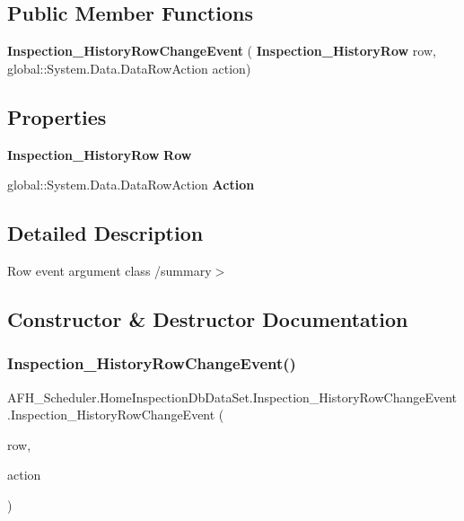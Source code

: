 \subsection*{Public Member Functions}
\begin{DoxyCompactItemize}
\item 
\textbf{ Inspection\+\_\+\+History\+Row\+Change\+Event} (\textbf{ Inspection\+\_\+\+History\+Row} row, global\+::\+System.\+Data.\+Data\+Row\+Action action)
\end{DoxyCompactItemize}
\subsection*{Properties}
\begin{DoxyCompactItemize}
\item 
\textbf{ Inspection\+\_\+\+History\+Row} \textbf{ Row}\hspace{0.3cm}{\ttfamily  [get]}
\item 
global\+::\+System.\+Data.\+Data\+Row\+Action \textbf{ Action}\hspace{0.3cm}{\ttfamily  [get]}
\end{DoxyCompactItemize}


\subsection{Detailed Description}
Row event argument class /summary$>$ 

\subsection{Constructor \& Destructor Documentation}
\mbox{\label{class_a_f_h___scheduler_1_1_home_inspection_db_data_set_1_1_inspection___history_row_change_event_ac807f94604f34417410b8af102ee1858}} 
\subsubsection{Inspection\_HistoryRowChangeEvent()}
{\footnotesize\ttfamily A\+F\+H\+\_\+\+Scheduler.\+Home\+Inspection\+Db\+Data\+Set.\+Inspection\+\_\+\+History\+Row\+Change\+Event.\+Inspection\+\_\+\+History\+Row\+Change\+Event (\begin{DoxyParamCaption}\item[{\textbf{ Inspection\+\_\+\+History\+Row}}]{row,  }\item[{global\+::\+System.\+Data.\+Data\+Row\+Action}]{action }\end{DoxyParamCaption})}



